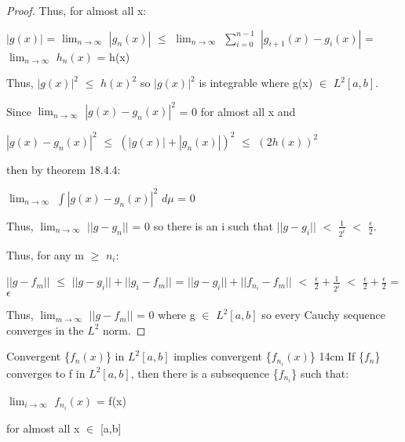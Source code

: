 \begin{proof}
        Thus, for almost all x:

        \hspace{0.5cm}
        $|g(x)|$
        = $\lim_{n \rightarrow \infty}$ $|g_n(x)|$
        $\leq$ $\lim_{n \rightarrow \infty}$
            $\sum_{i=0}^{n-1}$ $|g_{i+1}(x) - g_i(x)|$
        = $\lim_{n \rightarrow \infty}$ $h_n(x)$
        = h(x)

        Thus, $|g(x)|^2$ $\leq$ $h(x)^2$
        so $|g(x)|^2$ is integrable where g(x) $\in$ $L^2[a,b]$.

        Since $\lim_{n \rightarrow \infty}$ $|g(x) - g_n(x)|^2$ = 0
        for almost all x and

        \hspace{0.5cm}
        $|g(x) - g_n(x)|^2$
        $\leq$ $(|g(x)| + |g_n(x)|)^2$
        $\leq$ $(2h(x))^2$
        
        then by {\color{red} theorem 18.4.4}:

        \hspace{0.5cm}
        $\lim_{n \rightarrow \infty}$ $\int |g(x) - g_n(x)|^2$ $d\mu$ = 0

        Thus, $\lim_{n \rightarrow \infty}$ $||g-g_n||$ = 0
        so there is an i such that $||g-g_i||$ $<$ $\frac{1}{2^i}$
        $<$ $\frac{\epsilon}{2}$.

        Thus, for any m $\geq$ $n_i$:

        \hspace{0.5cm}
        $||g - f_m||$
        $\leq$ $||g - g_i|| + ||g_i - f_m||$
        = $||g - g_i|| + ||f_{n_i} - f_m||$
        $<$ $\frac{\epsilon}{2} + \frac{1}{2^i}$
        $<$ $\frac{\epsilon}{2} + \frac{\epsilon}{2}$
        = $\epsilon$

        Thus, $\lim_{m \rightarrow \infty}$ $||g - f_m||$ = 0
        where g $\in$ $L^2[a,b]$
        so every Cauchy sequence converges in the $L^2$ norm.
    \end{proof}

    \vspace{0.5cm}



    \begin{corollary}{Convergent \{$f_n(x)$\} in $L^2[a,b]$
    implies convergent \{$f_{n_i}(x)$\} }{14cm}
        If \{$f_n$\} converges to f in $L^2[a,b]$, then
        there is a subsequence \{$f_{n_i}$\} such that:

        \hspace{0.5cm}
        $\lim_{i \rightarrow \infty}$ $f_{n_i}(x)$ = f(x)

        for almost all x $\in$ [a,b]
    \end{corollary}

